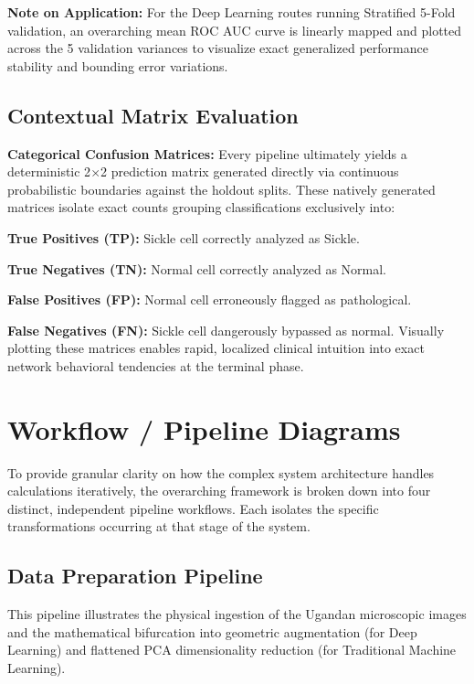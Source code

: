 \noindent\textbf{Note on Application:} For the Deep Learning routes running Stratified 5-Fold validation, an overarching mean ROC AUC curve is linearly mapped and plotted across the 5 validation variances to visualize exact generalized performance stability and bounding error variations.

\subsection{Contextual Matrix Evaluation}

\noindent\textbf{Categorical Confusion Matrices:} Every pipeline ultimately yields a deterministic 2$\times$2 prediction matrix generated directly via continuous probabilistic boundaries against the holdout splits. These natively generated matrices isolate exact counts grouping classifications exclusively into:

\noindent\textbf{True Positives (TP):} Sickle cell correctly analyzed as Sickle.

\noindent\textbf{True Negatives (TN):} Normal cell correctly analyzed as Normal.

\noindent\textbf{False Positives (FP):} Normal cell erroneously flagged as pathological.

\noindent\textbf{False Negatives (FN):} Sickle cell dangerously bypassed as normal. Visually plotting these matrices enables rapid, localized clinical intuition into exact network behavioral tendencies at the terminal phase.

\section{Workflow / Pipeline Diagrams}

To provide granular clarity on how the complex system architecture handles calculations iteratively, the overarching framework is broken down into four distinct, independent pipeline workflows. Each isolates the specific transformations occurring at that stage of the system.

\subsection{Data Preparation Pipeline}

This pipeline illustrates the physical ingestion of the Ugandan microscopic images and the mathematical bifurcation into geometric augmentation (for Deep Learning) and flattened PCA dimensionality reduction (for Traditional Machine Learning).

